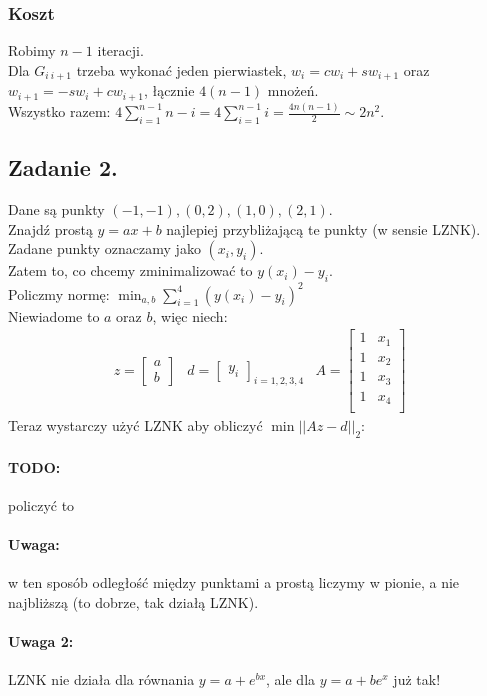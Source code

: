 \documentclass{article}
\begin{document}
\subsubsection{Koszt}
Robimy $ n-1 $ iteracji.\\
Dla $ G_{i\ i+1} $ trzeba wykonać jeden pierwiastek, $ w_i =cw_i+sw_{i+1}$ oraz $w_{i+1} = -sw_i + cw_{i+1}$, łącznie $4(n-1) $ mnożeń.\\
Wszystko razem: $4\sum_{i=1}^{n-1}n-i=4\sum_{i=1}^{n-1}i=\frac{4n(n-1)}{2}\sim2n^2$.
\subsection{Zadanie 2.}
Dane są punkty $(-1, -1), (0,2), (1, 0), (2, 1)$.\\
Znajdź prostą $ y=ax+b $ najlepiej przybliżającą te punkty (w sensie LZNK).\\
Zadane punkty oznaczamy jako $ (x_i, y_i) $.\\
Zatem to, co chcemy zminimalizować to $y(x_i)-y_i$.\\
Policzmy normę: $ \min_{a, b} \sum_{i=1}^{4}(y(x_i)-y_i)^2$\\
Niewiadome to $ a $ oraz $ b $, więc niech:
$$
\begin{matrix}
	z=\begin{bmatrix}a\\b\end{bmatrix}&
	d=\begin{bmatrix}y_i\end{bmatrix}_{i=1, 2, 3, 4}&
	A=\begin{bmatrix}
		1&x_1\\
		1&x_2\\
		1&x_3\\
		1&x_4\\
	\end{bmatrix}
\end{matrix}
$$
Teraz wystarczy użyć LZNK aby obliczyć $\min{||Az-d||_2}$:
\paragraph{TODO:} policzyć to
\paragraph{Uwaga:} w ten sposób odległość między punktami a prostą liczymy w pionie, a nie najbliższą (to dobrze, tak działą LZNK).
\paragraph{Uwaga 2:} LZNK nie działa dla równania $ y=a+e^{bx} $, ale dla $ y=a+be^x $ już tak!
\end{document}
